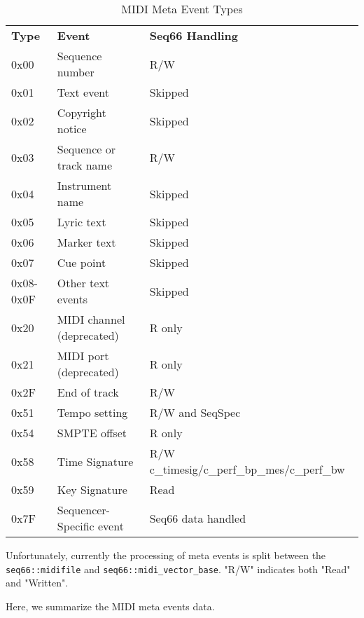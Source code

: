    \begin{table}
      \centering
      \caption{MIDI Meta Event Types}
      \label{table:midi_meta_event_types}
      \begin{tabular}{l l l}
         \textbf{Type} & \textbf{Event} & \textbf{Seq66 Handling}\\
         0x00 & Sequence number                 & R/W \\
         0x01 & Text event                      & Skipped \\
         0x02 & Copyright notice                & Skipped \\
         0x03 & Sequence or track name          & R/W \\
         0x04 & Instrument name                 & Skipped \\
         0x05 & Lyric text                      & Skipped \\
         0x06 & Marker text                     & Skipped \\
         0x07 & Cue point                       & Skipped \\
         0x08-0x0F & Other text events          & Skipped \\
         0x20 & MIDI channel (deprecated)       & R only \\
         0x21 & MIDI port (deprecated)          & R only \\
         0x2F & End of track                    & R/W \\
         0x51 & Tempo setting                   & R/W and SeqSpec \\
         0x54 & SMPTE offset                    & R only \\
         0x58 & Time Signature & R/W c\_timesig/c\_perf\_bp\_mes/c\_perf\_bw \\
         0x59 & Key Signature                   & Read \\
         0x7F & Sequencer-Specific event        & Seq66 data handled \\
      \end{tabular}
   \end{table}

   Unfortunately, currently the processing of meta events is split between the
   \texttt{seq66::midifile} and
   \texttt{seq66::midi\_vector\_base}.
   "R/W" indicates both "Read" and "Written".

   Here, we summarize the MIDI meta events data.

